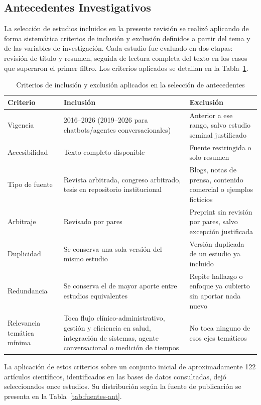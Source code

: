 \subsection{Antecedentes Investigativos}

La selección de estudios incluidos en la presente revisión se realizó aplicando de
forma sistemática criterios de inclusión y exclusión definidos a partir del tema y de
las variables de investigación. Cada estudio fue evaluado en dos etapas: revisión de
título y resumen, seguida de lectura completa del texto en los casos que superaron el
primer filtro. Los criterios aplicados se detallan en la Tabla~\ref{tab:criterios-ant}.

\begin{table}[H]
\centering
\small
\renewcommand{\arraystretch}{1.3}
\begin{tabular}{|p{}|p{}|p{}|}
\hline
\textbf{Criterio} & \textbf{Inclusión} & \textbf{Exclusión} \\
\hline
Vigencia &
  2016--2026 (2019--2026 para chatbots/agentes conversacionales) &
  Anterior a ese rango, salvo estudio seminal justificado \\
\hline
Accesibilidad &
  Texto completo disponible &
  Fuente restringida o solo resumen \\
\hline
Tipo de fuente &
  Revista arbitrada, congreso arbitrado, tesis en repositorio institucional &
  Blogs, notas de prensa, contenido comercial o ejemplos ficticios \\
\hline
Arbitraje &
  Revisado por pares &
  Preprint sin revisión por pares, salvo excepción justificada \\
\hline
Duplicidad &
  Se conserva una sola versión del mismo estudio &
  Versión duplicada de un estudio ya incluido \\
\hline
Redundancia &
  Se conserva el de mayor aporte entre estudios equivalentes &
  Repite hallazgo o enfoque ya cubierto sin aportar nada nuevo \\
\hline
Relevancia temática mínima &
  Toca flujo clínico-administrativo, gestión y eficiencia en salud,
  integración de sistemas, agente conversacional o medición de tiempos &
  No toca ninguno de esos ejes temáticos \\
\hline
\end{tabular}
\caption{Criterios de inclusión y exclusión aplicados en la selección de antecedentes}
\label{tab:criterios-ant}
\end{table}

La aplicación de estos criterios sobre un conjunto inicial de aproximadamente
122 artículos científicos, identificados en las bases de datos consultadas, dejó
seleccionados once estudios. Su distribución según la fuente de publicación se
presenta en la Tabla~\ref{tab:fuentes-ant}.

